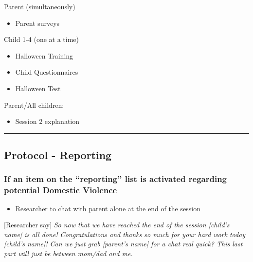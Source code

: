 \documentclass[]{book}
\providecommand{\tightlist}{%
  \setlength{\itemsep}{0pt}\setlength{\parskip}{0pt}}
\begin{document}
Parent (simultaneously)

\begin{itemize}
\tightlist
\item
  Parent surveys
\end{itemize}

Child 1-4 (one at a time)

\begin{itemize}
\tightlist
\item
  Halloween Training
\item
  Child Questionnaires
\item
  Halloween Test
\end{itemize}

Parent/All children:

\begin{itemize}
\tightlist
\item
  Session 2 explanation
\end{itemize}

\begin{center}\rule{0.5\linewidth}{0.5pt}\end{center}

\hypertarget{protocol---reporting}{%
\subsection{Protocol - Reporting}\label{protocol---reporting}}

\hypertarget{if-an-item-on-the-reporting-list-is-activated-regarding-potential-domestic-violence}{%
\subsubsection{If an item on the ``reporting'' list is activated regarding potential Domestic Violence}\label{if-an-item-on-the-reporting-list-is-activated-regarding-potential-domestic-violence}}

\begin{itemize}
\tightlist
\item
  Researcher to chat with parent alone at the end of the session
\end{itemize}

{[}Researcher say{]} \emph{So now that we have reached the end of the session {[}child's name{]} is all done! Congratulations and thanks so much for your hard work today {[}child's name{]}! Can we just grab {[}parent's name{]} for a chat real quick? This last part will just be between mom/dad and me.}
\end{document}

